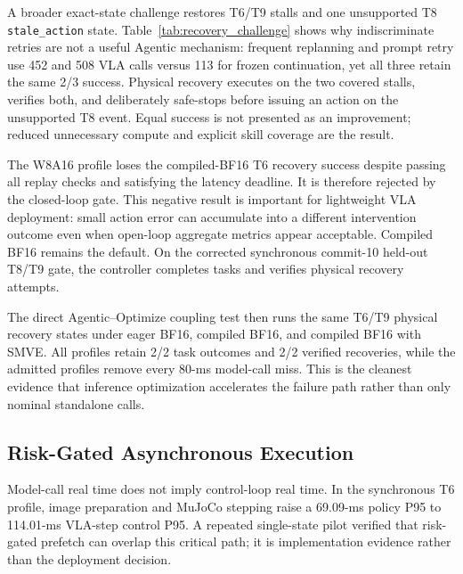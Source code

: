 \documentclass[runningheads]{waica}
\begin{document}
A broader exact-state challenge restores T6/T9 stalls and one unsupported T8
\texttt{stale\_action} state. Table~\ref{tab:recovery_challenge} shows why
indiscriminate retries are not a useful Agentic mechanism: frequent replanning
and prompt retry use 452 and 508 VLA calls versus 113 for frozen continuation,
yet all three retain the same 2/3 success. Physical recovery executes on the
two covered stalls, verifies both, and deliberately safe-stops before issuing
an action on the unsupported T8 event. Equal success is not presented as an
improvement; reduced unnecessary compute and explicit skill coverage are the
result.



The W8A16 profile loses the compiled-BF16 T6 recovery success despite passing
all replay checks and satisfying the latency deadline. It is therefore rejected
by the closed-loop gate. This negative result is important for lightweight VLA
deployment: small action error can accumulate into a different intervention
outcome even when open-loop aggregate metrics appear acceptable. Compiled BF16
remains the default. On the corrected synchronous commit-10 held-out T8/T9
gate, the controller completes \CarveSyncTenSuccess{} tasks and verifies
\CarveSyncTenRecovery{} physical recovery attempts.

The direct Agentic--Optimize coupling test then runs the same T6/T9 physical
recovery states under eager BF16, compiled BF16, and compiled BF16 with SMVE.
All profiles retain 2/2 task outcomes and 2/2 verified recoveries, while the
admitted profiles remove every 80-ms model-call miss. This is the cleanest
evidence that inference optimization accelerates the failure path rather than
only nominal standalone calls.



\subsection{Risk-Gated Asynchronous Execution}

Model-call real time does not imply control-loop real time. In the synchronous
T6 profile, image preparation and MuJoCo stepping raise a 69.09-ms policy P95
to 114.01-ms VLA-step control P95. A repeated single-state pilot verified that
risk-gated prefetch can overlap this critical path; it is implementation
evidence rather than the deployment decision.
\end{document}
